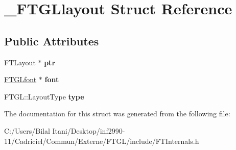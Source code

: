 \hypertarget{struct___f_t_g_llayout}{}\section{\+\_\+\+F\+T\+G\+Llayout Struct Reference}
\label{struct___f_t_g_llayout}
\subsection*{Public Attributes}
\begin{DoxyCompactItemize}
\item 
F\+T\+Layout $\ast$ {\bfseries ptr}\hypertarget{struct___f_t_g_llayout_aa005e0b4dbed84077bc849aee6cc072a}{}\label{struct___f_t_g_llayout_aa005e0b4dbed84077bc849aee6cc072a}

\item 
\hyperlink{struct___f_t_g_lfont}{F\+T\+G\+Lfont} $\ast$ {\bfseries font}\hypertarget{struct___f_t_g_llayout_a85b58d0b7343ae0b396417b3cf74ce06}{}\label{struct___f_t_g_llayout_a85b58d0b7343ae0b396417b3cf74ce06}

\item 
F\+T\+G\+L\+::\+Layout\+Type {\bfseries type}\hypertarget{struct___f_t_g_llayout_ace10a672a5f6d779ede1c6dfba6096f2}{}\label{struct___f_t_g_llayout_ace10a672a5f6d779ede1c6dfba6096f2}

\end{DoxyCompactItemize}


The documentation for this struct was generated from the following file\+:\begin{DoxyCompactItemize}
\item 
C\+:/\+Users/\+Bilal Itani/\+Desktop/inf2990-\/11/\+Cadriciel/\+Commun/\+Externe/\+F\+T\+G\+L/include/F\+T\+Internals.\+h\end{DoxyCompactItemize}
